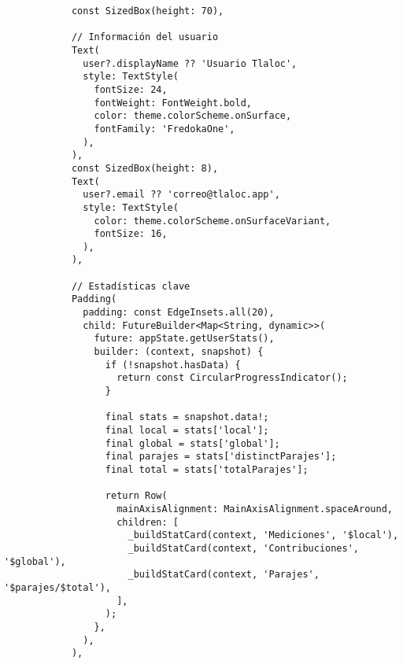 \begin{verbatim}
            const SizedBox(height: 70),

            // Información del usuario
            Text(
              user?.displayName ?? 'Usuario Tlaloc',
              style: TextStyle(
                fontSize: 24,
                fontWeight: FontWeight.bold,
                color: theme.colorScheme.onSurface,
                fontFamily: 'FredokaOne',
              ),
            ),
            const SizedBox(height: 8),
            Text(
              user?.email ?? 'correo@tlaloc.app',
              style: TextStyle(
                color: theme.colorScheme.onSurfaceVariant,
                fontSize: 16,
              ),
            ),

            // Estadísticas clave
            Padding(
              padding: const EdgeInsets.all(20),
              child: FutureBuilder<Map<String, dynamic>>(
                future: appState.getUserStats(),
                builder: (context, snapshot) {
                  if (!snapshot.hasData) {
                    return const CircularProgressIndicator();
                  }

                  final stats = snapshot.data!;
                  final local = stats['local'];
                  final global = stats['global'];
                  final parajes = stats['distinctParajes'];
                  final total = stats['totalParajes'];

                  return Row(
                    mainAxisAlignment: MainAxisAlignment.spaceAround,
                    children: [
                      _buildStatCard(context, 'Mediciones', '$local'),
                      _buildStatCard(context, 'Contribuciones', '$global'),
                      _buildStatCard(context, 'Parajes', '$parajes/$total'),
                    ],
                  );
                },
              ),
            ),
 

\end{verbatim}
